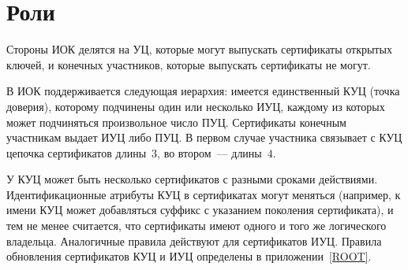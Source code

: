 \section{Роли}\label{ENTITIES.Roles}

Стороны ИОК делятся на УЦ, которые могут выпускать сертификаты открытых ключей, 
и конечных участников, которые выпускать сертификаты не могут.

В ИОК поддерживается следующая иерархия: имеется единственный КУЦ (точка
доверия), которому подчинены один или несколько ИУЦ, каждому из
которых может подчиняться произвольное число ПУЦ. Сертификаты конечным
участникам выдает ИУЦ либо ПУЦ.
%
В первом случае участника связывает с КУЦ цепочка сертификатов длины~$3$,
во втором~--- длины~$4$.

У КУЦ может быть несколько сертификатов с разными сроками действиями.
Идентификационные атрибуты КУЦ в сертификатах могут меняться (например, к имени
КУЦ может добавляться суффикс с указанием поколения сертификата), и тем не менее
считается, что сертификаты имеют одного и того же логического владельца.
Аналогичные правила действуют для сертификатов ИУЦ. Правила обновления
сертификатов КУЦ и ИУЦ определены в приложении~\ref{ROOT}.

